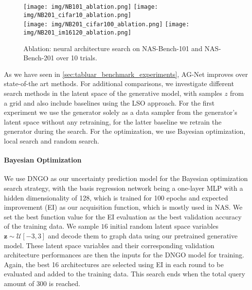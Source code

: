 \documentclass[runningheads]{llncs}
\begin{document}
\begin{figure*}[t]
	\centering
	\texttt{[image: img/NB101\_ablation.png]}
	\texttt{[image: img/NB201\_cifar10\_ablation.png]}\\
	\texttt{[image: img/NB201\_cifar100\_ablation.png]}
	\texttt{[image: img/NB201\_im16120\_ablation.png]}
	\caption{Ablation: neural architecture search on NAS-Bench-101 and  NAS-Bench-201 over 10 trials. 
		\label{fig:NB201_search_ablation} \label{fig:NB101_search_ablation}}
\end{figure*}


As we have seen in \autoref{sec:tabluar_benchmark_experiments}, AG-Net improves over state-of-the art methods.
For additional comparisons, we investigate different search methods in the latent space of the generative model, with samples $z$ from a grid and also include baselines using the LSO approach. For the first experiment we use the generator solely as a data sampler from the generator's latent space without any retraining, for the latter baseline we retrain the generator during the search.
For the optimization, we use Bayesian optimization, local search and random search. 

\paragraph{Bayesian Optimization}
We use DNGO\cite{2015DNGO} as our uncertainty prediction model for the Bayesian optimization search strategy, with the basis regression network being a one-layer MLP with a hidden dimensionality of 128, which is trained for 100 epochs and expected improvement (EI) \cite{74Mockus} as our acquisition function, which is mostly used in NAS. We set the best function value for the EI evaluation as the best validation accuracy of the training data.
We sample $16$ initial random latent space variables $\textbf{z} \sim \mathcal{U}[-3,3]$ and decode them to graph data using our pretrained generative model.
These latent space variables and their corresponding validation architecture performances are then the inputs for the DNGO model for training.
Again, the best 16 architectures are selected using EI in each round to be evaluated and added to the training data.
This search ends when the total query amount of $300$ is reached.
\end{document}
